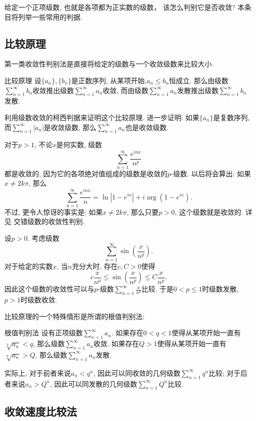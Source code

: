 

给定一个正项级数, 也就是各项都为正实数的级数， 该怎么判别它是否收敛? 本条目将列举一些常用的判据.

\subsection{比较原理}

第一类收敛性判别法是直接将给定的级数与一个收敛级数来比较大小. 

\begin{theorem}{比较原理}
设$\{a_n\},\{b_n\}$是正数序列, 从某项开始,$a_n\leq b_n$恒成立. 那么由级数$\sum_{n=1}^\infty b_n$收敛推出级数$\sum_{n=1}^\infty a_n$收敛, 而由级数$\sum_{n=1}^\infty a_n$发散推出级数$\sum_{n=1}^\infty b_n$发散.
\end{theorem}
\begin{exercise}{}
利用级数收敛的柯西判据来证明这个比较原理. 进一步证明: 如果$\{a_n\}$是复数序列, 而$\sum_{n=1}^\infty|a_n|$是收敛级数, 那么$\sum_{n=1}^\infty a_n$也是收敛级数.
\end{exercise}

\begin{example}{}
对于$p>1$, 不论$x$是何实数, 级数
$$
\sum_{n=1}^\infty\frac{e^{inx}}{n^p}
$$
都是收敛的, 因为它的各项绝对值组成的级数是收敛的$p$-级数. 以后将会算出: 如果$x\neq 2k\pi$, 那么
$$
\sum_{n=1}^\infty\frac{e^{inx}}{n}=\ln|1-e^{ix}|+i\arg(1-e^{ix}).
$$
不过, 更令人惊讶的事实是: 如果$x\neq 2k\pi$, 那么只要$p>0$, 这个级数就是收敛的. 详见 交错级数的收敛性判别.
\end{example}

\begin{example}{}
设$p>0$. 考虑级数
$$
\sum_{n=1}^\infty\sin\left(\frac{x}{n^p}\right).
$$
对于给定的实数$x$, 当$n$充分大时, 存在$c,C>0$使得
$$
c\frac{x}{n^p}\leq\sin\left(\frac{x}{n^p}\right)\leq C\frac{x}{n^p}.
$$
因此这个级数的收敛性可以与$p$-级数$\sum_{n=1}^\infty\frac{x}{n^p}$比较. 于是$0<p\leq1$时级数发散, $p>1$时级数收敛.
\end{example}

比较原理的一个特殊情形是所谓的根值判别法:

\begin{theorem}{根值判别法}
设有正项级数$\sum_{n=1}^\infty a_n$. 如果存在$0<q<1$使得从某项开始一直有$\sqrt[n]{a_n}<q$, 那么级数$\sum_{n=1}^\infty a_n$收敛. 如果存在$Q>1$使得从某项开始一直有$\sqrt[n]{a_n}>Q$, 那么级数$\sum_{n=1}^\infty a_n$发散.
\end{theorem}
实际上, 对于前者来说$a_n<q^n$, 因此可以同收敛的几何级数$\sum_{n=1}^\infty q^n$比较; 对于后者来说$a_n>Q^n$, 因此可以同发散的几何级数$\sum_{n=1}^\infty Q^n$比较.

\subsection{收敛速度比较法}